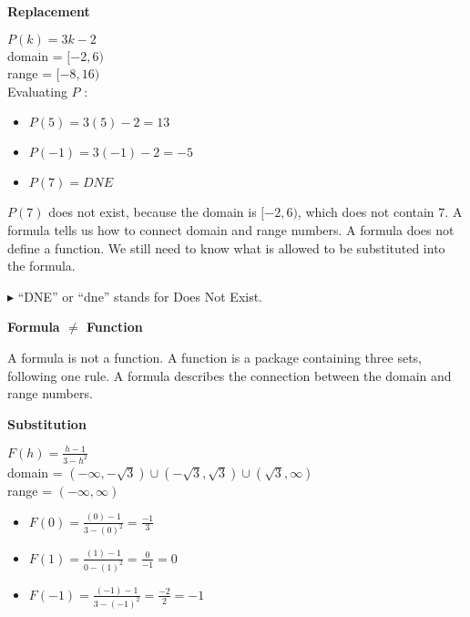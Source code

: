 \documentclass{ximera}
\begin{document}
  
\begin{procedure}   \textbf{\textcolor{purple!85!blue}{Replacement}}    

$P(k) = 3k - 2$ \\
domain = $[-2, 6)$ \\
range = $[-8, 16)$ \\

Evaluating $P$ :
\begin{itemize}
\item $P(5) = 3(5) - 2 = 13$
\item $P(-1) = 3(-1) - 2 = -5$
\item $P(7) = DNE$
\end{itemize}


$P(7)$ does not exist, because the domain is $[-2, 6)$, which does not contain $7$.  A formula tells us how to connect domain and range numbers.  A formula does not define a function.  We still need to know what is allowed to be substituted into the formula.

\end{procedure}
$\blacktriangleright$ ``DNE'' or ``dne'' stands for Does Not Exist. 



\begin{warning}  \textbf{\textcolor{red!90!darkgray}{Formula $\ne$ Function}}   

A formula is not a function.  A function is a package containing three sets, following one rule.  A formula describes the connection between the domain and range numbers.

\end{warning}





\begin{procedure}   \textbf{\textcolor{purple!85!blue}{Substitution}}      

$F(h) = \frac{h-1}{3-h^2}$ \\
domain = $(-\infty, -\sqrt{3}) \cup (-\sqrt{3}, \sqrt{3}) \cup (\sqrt{3}, \infty)$ \\
range = $(-\infty, \infty)$


\begin{itemize}
\item $F(0) = \frac{(0) - 1}{3 - (0)^2} = \frac{-1}{3}$
\item $F(1) = \frac{(1) - 1}{0 - (1)^2} = \frac{0}{-1} = 0$
\item $F(-1) = \frac{(-1) - 1}{3 - (-1)^2} = \frac{-2}{2} = -1$
\end{itemize}

\end{procedure}
\end{document}

